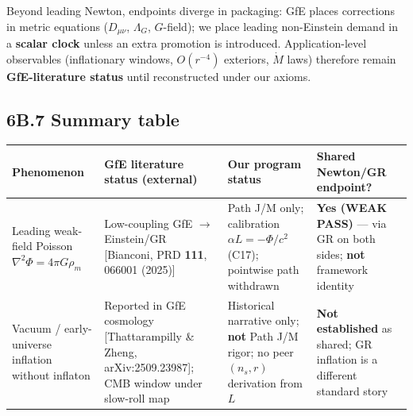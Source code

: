 \documentclass[
  11pt,
]{article}
\newcounter{none} %
\begin{document}
Beyond leading Newton, endpoints diverge in packaging: GfE places
corrections in metric equations (\(D_{\mu\nu}\), \(\Lambda_G\),
\(G\)-field); we place leading non-Einstein demand in a \textbf{scalar
clock} unless an extra promotion is introduced. Application-level
observables (inflationary windows, \(O(r^{-4})\) exteriors, \(\dot M\)
laws) therefore remain \textbf{GfE-literature status} until
reconstructed under our axioms.

\subsection{6B.7 Summary table}\label{b.7-summary-table}

{\def\LTcaptype{none} %
\begin{longtable}[]{@{}
  >{\raggedright\arraybackslash}p{}
  >{\raggedright\arraybackslash}p{}
  >{\raggedright\arraybackslash}p{}
  >{\raggedright\arraybackslash}p{}@{}}
\toprule\noalign{}
\begin{minipage}[b]{\linewidth}\raggedright
Phenomenon
\end{minipage} & \begin{minipage}[b]{\linewidth}\raggedright
GfE literature status (external)
\end{minipage} & \begin{minipage}[b]{\linewidth}\raggedright
Our program status
\end{minipage} & \begin{minipage}[b]{\linewidth}\raggedright
Shared Newton/GR endpoint?
\end{minipage} \\
\midrule\noalign{}
\endhead
\bottomrule\noalign{}
\endlastfoot
Leading weak-field Poisson \(\nabla^2\Phi=4\pi G\rho_m\) & Low-coupling
GfE \(\to\) Einstein/GR [Bianconi, PRD \textbf{111}, 066001 (2025)]
& Path J/M only; calibration \(\alpha L=-\Phi/c^2\) (C17); pointwise path
withdrawn & \textbf{Yes (WEAK PASS)} --- via GR on both sides;
\textbf{not} framework identity \\
Vacuum / early-universe inflation without inflaton & Reported in GfE
cosmology [Thattarampilly \& Zheng, arXiv:2509.23987]; CMB window
under slow-roll map & Historical narrative only; \textbf{not} Path J/M
rigor; no peer \((n_s,r)\) derivation from \(L\) & \textbf{Not
established} as shared; GR inflation is a different standard story \\

\end{longtable}}
\end{document}
